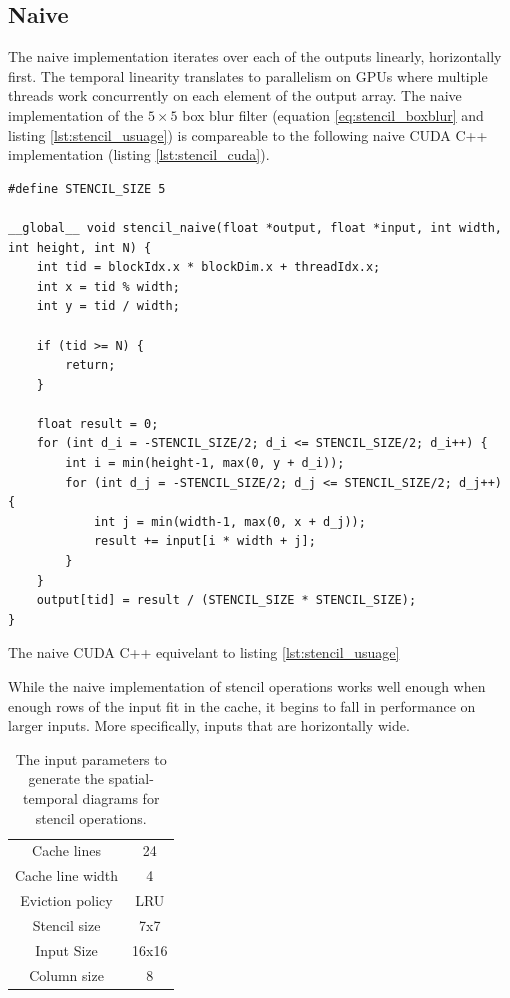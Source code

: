 \subsection{Naive}
\label{sec:stencil_naive}
The naive implementation iterates over each of the outputs linearly, horizontally first.
The temporal linearity translates to parallelism on GPUs where multiple threads work concurrently on each element of the output array.
The naive implementation of the $5 \times 5$ box blur filter (equation \ref{eq:stencil_boxblur} and listing \ref{lst:stencil_usuage}) is compareable to the following naive CUDA C++ implementation (listing \ref{lst:stencil_cuda}).

\begin{listing}[h]
    \begin{verbatim}
#define STENCIL_SIZE 5

__global__ void stencil_naive(float *output, float *input, int width, int height, int N) {
    int tid = blockIdx.x * blockDim.x + threadIdx.x;
    int x = tid % width;
    int y = tid / width;
    
    if (tid >= N) {
        return;
    }

    float result = 0;
    for (int d_i = -STENCIL_SIZE/2; d_i <= STENCIL_SIZE/2; d_i++) {
        int i = min(height-1, max(0, y + d_i));
        for (int d_j = -STENCIL_SIZE/2; d_j <= STENCIL_SIZE/2; d_j++) {
            int j = min(width-1, max(0, x + d_j));
            result += input[i * width + j];
        }
    }
    output[tid] = result / (STENCIL_SIZE * STENCIL_SIZE);
}
    \end{verbatim}
    \caption{
        The naive CUDA C++ equivelant to listing \ref{lst:stencil_usuage}
    }
    \label{lst:stencil_cuda}
\end{listing}

While the naive implementation of stencil operations works well enough when enough rows of the input fit in the cache, it begins to fall in performance on larger inputs.
More specifically, inputs that are horizontally wide.

\begin{table}[h]
    \centering
    \begin{tabular}{|c c|}
        \hline
        Cache lines      & 24   \\
        Cache line width & 4    \\
        Eviction policy  & LRU  \\
        \hline
        Stencil size     & 7x7  \\
        Input Size       & 16x16\\
        Column size      & 8    \\
        \hline
    \end{tabular}
    \caption{
        The input parameters to generate the spatial-temporal diagrams for stencil operations.
    }
    \label{tab:sim_stencil_params}
\end{table}

